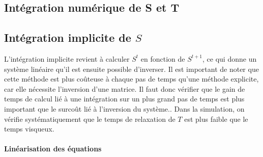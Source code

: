 \subsection{Intégration numérique de S et T}\subsection{Intégration implicite de $S$}
\label{ssec:integration_S_imp}
L'intégration implicite revient à calculer $S^t$ en fonction de $S^{t+1}$, ce qui donne un système linéaire qu'il est ensuite possible d'inverser. Il est important de noter que cette méthode est plus coûteuse à chaque pas de temps qu'une méthode explicite, car elle nécessite l'inversion d'une matrice. Il faut donc vérifier que le gain de temps de calcul lié à une intégration sur un plus grand pas de temps est plus important que le surcoût lié à l'inversion du système.. Dans la simulation, on vérifie systématiquement que le temps de relaxation de $T$ est plus faible que le temps visqueux.

\paragraph{Linéarisation des équations}

